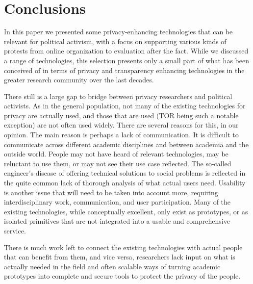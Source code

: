 \section{Conclusions}
\label{Conclusions}

In this paper we presented some privacy-enhancing technologies that can be 
relevant for political activism, with a focus on supporting various kinds of 
protests from online organization to evaluation after the fact. While we 
discussed a range of technologies, this selection presents only a small part of 
what has been conceived of in terms of privacy and transparency enhancing 
technologies in the greater research community over the last decades. 

There 
still is a large gap to bridge between privacy researchers and political 
activists. As in the general population, not many of the existing technologies 
for privacy are actually used, and those that are used (TOR being such a 
notable exception) are not often used widely. There are several reasons for 
this, in our opinion. The main reason is perhaps a lack of communication. It is 
difficult to communicate across different academic disciplines and between 
academia and the outside world. People may not have heard of relevant 
technologies, may be reluctant to use them, or may not see their use case 
reflected. The so-called engineer's disease of offering technical solutions to 
social problems is reflected in the quite common lack of thorough analysis of 
what actual users need. Usability is another issue that will need to be taken 
into account more, requiring interdisciplinary work, communication, and user 
participation. Many of the existing technologies, while conceptually excellent, 
only exist as prototypes, or as isolated primitives that are not integrated 
into a usable and comprehensive service. 

There is much work left to connect the 
existing technologies with actual people that can benefit from them, and vice 
versa, researchers lack input on what is actually needed in the field and often 
scalable ways of turning academic prototypes into complete and secure tools to 
protect the privacy of the people.
